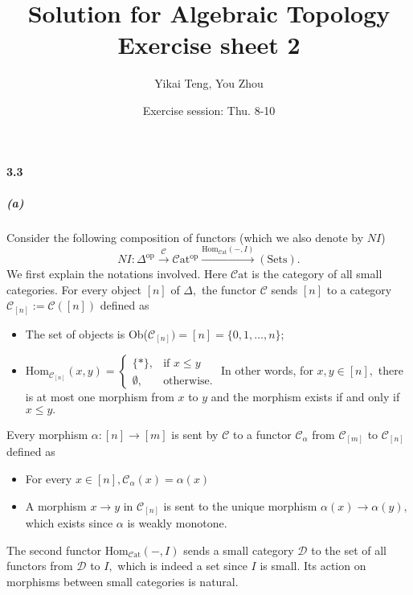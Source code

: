 \documentclass{article}
\title{Solution for Algebraic Topology Exercise sheet 2}
\author{Yikai Teng, You Zhou}
\date{Exercise session: Thu. 8-10}
\newcommand\cat{\mathcal{C}\mathrm{at}}
\newcommand\C{\mathcal{C}}
\begin{document}
\paragraph{3.3}
\subparagraph{(a)}Consider the following composition of functors (which we also denote by $NI$)
\[NI\colon\Delta^{\text{op}}\xrightarrow{\mathcal{C}}\cat^{\text{op}}\xrightarrow{\text{Hom}_{\cat}(-,I)}(\text{Sets}).\]
We first explain the notations involved. Here $\cat$ is the category of all small categories. For every object $[n]$ of $\Delta,$ the functor $\mathcal{C}$ sends $[n]$ to a category $\mathcal{C}_{[n]}:=\mathcal{C}([n])$ defined as
\begin{itemize}
  \item The set of objects is Ob($\mathcal{C}_{[n]}) =[n]=\{0,1,\ldots,n\}$;
  \item $\text{Hom}_{\mathcal{C}_{[n]}}(x,y)=\begin{cases}
                                                \{*\}, & \mbox{if } x\leq y \\
                                                \emptyset, & \mbox{otherwise}.
                                              \end{cases}$
  In other words, for $x,y\in[n],$ there is at most one morphism from $x$ to $y$ and the morphism exists if and only if $x\leq y.$
\end{itemize}
Every morphism $\alpha\colon[n]\rightarrow[m]$ is sent by $\mathcal{C}$ to a functor $\mathcal{C}_{\alpha}$ from $\mathcal{C}_{[m]}$ to $\C_{[n]}$ defined as
\begin{itemize}
  \item For every $x\in[n],\C_{\alpha}(x)=\alpha(x)$
  \item A morphism $x\rightarrow y$ in $\C_{[n]}$ is sent to the unique morphism $\alpha(x)\rightarrow\alpha(y),$ which exists since $\alpha$ is weakly monotone.
\end{itemize}
The second functor $\text{Hom}_{\cat}(-,I)$ sends a small category $\mathcal{D}$ to the set of all functors from $\mathcal{D}$ to $I,$ which is indeed a set since $I$ is small. Its action on morphisms between small categories is natural.
\end{document}
